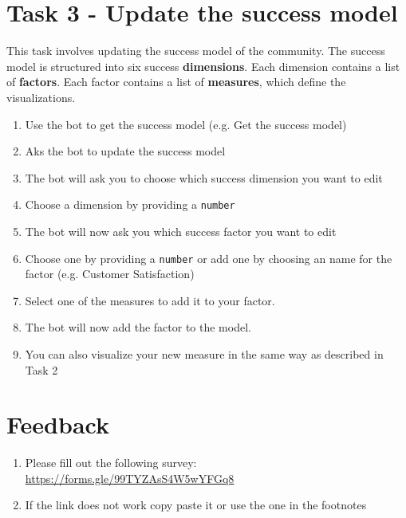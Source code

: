 \section*{Task 3 - Update the success model}
This task involves updating the success model of the community. The success model is structured into six success \textbf{dimensions}. Each dimension contains a list of \textbf{factors}. Each factor contains a list of \textbf{measures}, which define the visualizations.
\begin{enumerate}
    \item Use the bot to get the success model (e.g. Get the success model)
    \item Aks the bot to update the success model
    \item The bot will ask you to choose which success dimension you want to edit
    \item Choose a dimension by providing a \texttt{number}
    \item The bot will now ask you which success factor you want to edit
    \item Choose one by providing a \texttt{number} or add one by choosing an name for the factor (e.g. Customer Satisfaction)
    \item Select one of the measures to add it to your factor. 
    \item The bot will now add the factor to the model.
    \item You can also visualize your new measure in the same way as described in Task 2
\end{enumerate}

\section*{Feedback}
  
\begin{enumerate}
  \item Please fill out the following survey: \url{https://forms.gle/99TYZAsS4W5wYFGq8}
  \item If the link does not work copy paste it or use the one in the footnotes \footnotemark 
\end{enumerate}

